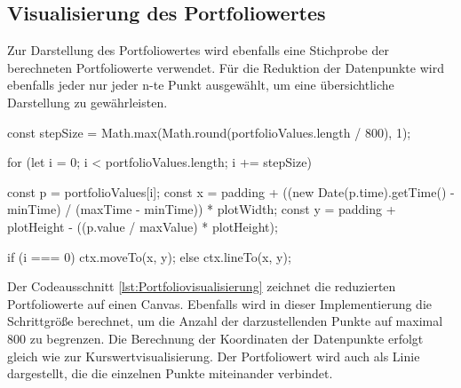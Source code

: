 \subsection{Visualisierung des Portfoliowertes}
\label{subsec:VisualisierungdesPortfoliowertes}

Zur Darstellung des Portfoliowertes wird ebenfalls eine Stichprobe der berechneten Portfoliowerte verwendet.
Für die Reduktion der Datenpunkte wird ebenfalls jeder nur jeder n-te Punkt ausgewählt, um eine übersichtliche Darstellung zu gewährleisten.

\begin{JsCode}[caption={Portfoliovisualisierung}, label={lst:Portfoliovisualisierung}]
    const stepSize = Math.max(Math.round(portfolioValues.length / 800), 1);

    for (let i = 0; i < portfolioValues.length; i += stepSize) {
        const p = portfolioValues[i];
        const x = padding + ((new Date(p.time).getTime() - minTime) / (maxTime - minTime)) * plotWidth;
        const y = padding + plotHeight - ((p.value / maxValue) * plotHeight);

        if (i === 0) {
            ctx.moveTo(x, y);
        }
        else {
            ctx.lineTo(x, y);
        }
    }
\end{JsCode}

Der Codeausschnitt \ref{lst:Portfoliovisualisierung} zeichnet die reduzierten Portfoliowerte auf einen Canvas.
Ebenfalls wird in dieser Implementierung die Schrittgröße berechnet, um die Anzahl der darzustellenden Punkte auf maximal 800 zu begrenzen.
Die Berechnung der Koordinaten der Datenpunkte erfolgt gleich wie zur Kurswertvisualisierung.
Der Portfoliowert wird auch als Linie dargestellt, die die einzelnen Punkte miteinander verbindet.